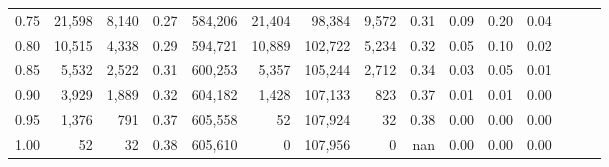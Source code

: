 \begin{tabular}{rrrrrrrrrrrrrrr}
0.75 &  21,598 &   8,140 &  0.27 &  584,206 &   21,404 &   98,384 &    9,572 &  0.31 &  0.09 &  0.20 &      0.04 \\
0.80 &  10,515 &   4,338 &  0.29 &  594,721 &   10,889 &  102,722 &    5,234 &  0.32 &  0.05 &  0.10 &      0.02 \\
0.85 &   5,532 &   2,522 &  0.31 &  600,253 &    5,357 &  105,244 &    2,712 &  0.34 &  0.03 &  0.05 &      0.01 \\
0.90 &   3,929 &   1,889 &  0.32 &  604,182 &    1,428 &  107,133 &      823 &  0.37 &  0.01 &  0.01 &      0.00 \\
0.95 &   1,376 &     791 &  0.37 &  605,558 &       52 &  107,924 &       32 &  0.38 &  0.00 &  0.00 &      0.00 \\
1.00 &      52 &      32 &  0.38 &  605,610 &        0 &  107,956 &        0 &   nan &  0.00 &  0.00 &      0.00 \\
\bottomrule
\end{tabular}
